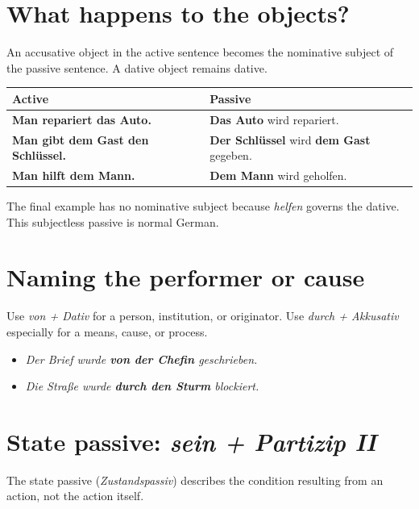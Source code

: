 \section{What happens to the objects?}

An accusative object in the active sentence becomes the nominative subject of
the passive sentence. A dative object remains dative.

\begin{center}
\small
{}
\begin{tabularx}{\textwidth}{@{}>{\bfseries}l X@{}}
\toprule
Active & Passive \\
\midrule
Man repariert \textbf{das Auto}.
  & \textbf{Das Auto} wird repariert. \\
Man gibt \textbf{dem Gast} \textbf{den Schlüssel}.
  & \textbf{Der Schlüssel} wird \textbf{dem Gast} gegeben. \\
Man hilft \textbf{dem Mann}.
  & \textbf{Dem Mann} wird geholfen. \\
\bottomrule
\end{tabularx}
\end{center}

The final example has no nominative subject because \textit{helfen} governs
the dative. This subjectless passive is normal German.

\section{Naming the performer or cause}

Use \textit{von + Dativ} for a person, institution, or originator. Use
\textit{durch + Akkusativ} especially for a means, cause, or process.

\begin{itemize}[leftmargin=*]
  \item \textit{Der Brief wurde \textbf{von der Chefin} geschrieben.}
  \item \textit{Die Straße wurde \textbf{durch den Sturm} blockiert.}
\end{itemize}

\section{State passive: \textit{sein + Partizip II}}

The state passive (\textit{Zustandspassiv}) describes the condition resulting
from an action, not the action itself.

